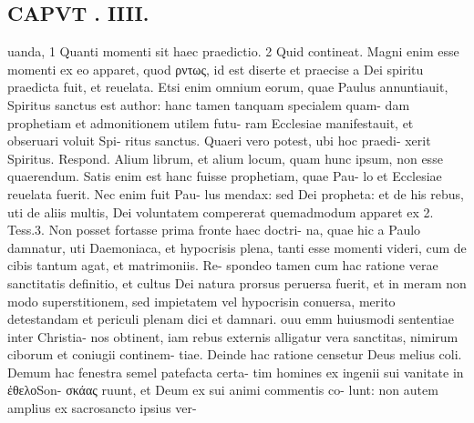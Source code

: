 \documentclass{article}
\begin{document}
\begin{pages}
\section*{CAPVT . IIII. }
\marginpar{[ p.181 ]}uanda, 1 Quanti momenti sit haec praedictio. 2 Quid contineat. Magni enim esse momenti ex eo apparet, quod ρντως, id est diserte et praecise a Dei spiritu praedicta fuit, et reuelata. Etsi enim omnium eorum, quae Paulus annuntiauit, Spiritus sanctus est author: hanc tamen tanquam specialem quam- dam prophetiam et admonitionem utilem futu- ram Ecclesiae manifestauit, et obseruari voluit Spi- ritus sanctus. Quaeri vero potest, ubi hoc praedi- xerit Spiritus. Respond. Alium librum, et alium locum, quam hunc ipsum, non esse quaerendum. Satis enim est hanc fuisse prophetiam, quae Pau- lo et Ecclesiae reuelata fuerit. Nec enim fuit Pau- lus mendax: sed Dei propheta: et de his rebus, uti de aliis multis, Dei voluntatem compererat quemadmodum apparet ex 2. Tess.3. Non posset fortasse prima fronte haec doctri- na, quae hic a Paulo damnatur, uti Daemoniaca, et hypocrisis plena, tanti esse momenti videri, cum de cibis tantum agat, et matrimoniis. Re- spondeo tamen cum hac ratione verae sanctitatis definitio, et cultus Dei natura prorsus peruersa fuerit, et in meram non modo superstitionem, sed impietatem vel hypocrisin conuersa, merito detestandam et periculi plenam dici et damnari. ouu emm huiusmodi sententiae inter Christia- nos obtinent, iam rebus externis alligatur vera sanctitas, nimirum ciborum et coniugii continem- tiae. Deinde hac ratione censetur Deus melius coli. Demum hac fenestra semel patefacta certa- tim homines ex ingenii sui vanitate in ἐθελοSon- σκάας ruunt, et Deum ex sui animi commentis co- lunt: non autem amplius ex sacrosancto ipsius ver- 

\end{pages}
\end{document}
